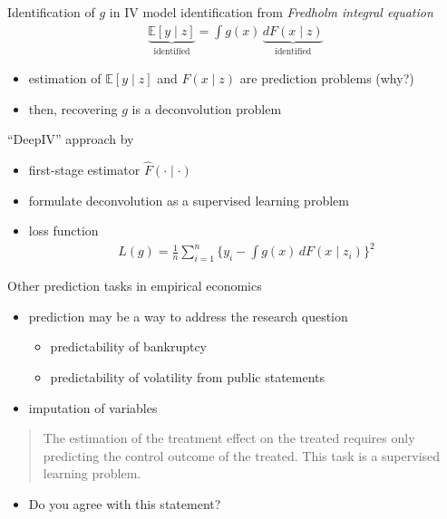 \documentclass[xcolor=dvipsnames, handout]{beamer}
\newcommand{\E}{\mathbb{E}}
\begin{document}
\begin{frame}{Identification of $g$ in IV model}
identification from \emph{Fredholm integral equation}
\begin{align*}
  \underbrace{\E[y \mid z]}_{\text{identified}} = \int g(x) \, \underbrace{dF(x \mid z)}_{\text{identified}}
\end{align*}
\begin{itemize}
  \item estimation of $\E[y \mid z]$ and $F(x \mid z)$ are prediction problems (why?)
  \item then, recovering $g$ is a deconvolution problem
\end{itemize}
\end{frame}


\begin{frame}{``DeepIV'' approach by \textcite{hartford2017deep}}
\begin{itemize}
  \item first-stage estimator $\hat{F}(\cdot \mid \cdot)$
  \item formulate deconvolution as a supervised learning problem
  \item loss function
  \begin{align*}
    L(g) = \frac{1}{n} \sum_{i=1}^n \Big\{
      y_i - \int g(x) \, dF(x \mid z_i)
    \Big\}^2 
  \end{align*}
\end{itemize}
\end{frame}


\begin{frame}{Other prediction tasks in empirical economics}
\begin{itemize}
  \item 
  prediction may be a way to address the research question
  \begin{itemize}
    \item predictability of bankruptcy \parencite{becerra2005neural}
    \item predictability of volatility from public statements \parencite{kogan2009predicting}
  \end{itemize}
  \item 
  imputation of variables
\end{itemize}
\pause
\begin{quote}
The estimation of the treatment effect on the treated requires only predicting the control outcome of the treated. 
This task is a supervised learning problem.
\end{quote}
\begin{itemize}
  \item Do you agree with this statement?
\end{itemize}
\end{frame}
\end{document}
